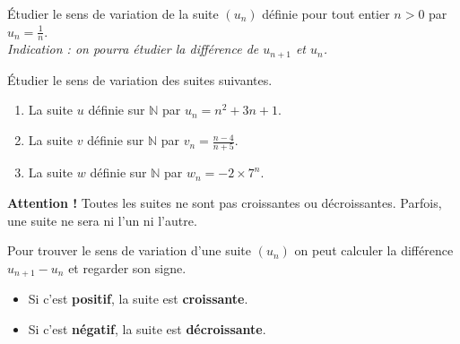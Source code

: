 \documentclass[11pt]{article}
\begin{document}
\begin{app}
  Étudier le sens de variation de la suite $(u_n)$ définie pour tout entier
  $n>0$ par $u_n=\frac{1}{n}$.\\
  \emph{Indication : on pourra étudier la différence de $u_{n+1}$ et $u_n$.}
\end{app}

\begin{app}
  Étudier le sens de variation des suites suivantes.
  \begin{enumerate}
    \item La suite $u$ définie sur $\mathbb{N}$ par $u_n=n^2+3n+1$.
    \item La suite $v$ définie sur $\mathbb{N}$ par $v_n=\frac{n-4}{n+5}$.
    \item La suite $w$ définie sur $\mathbb{N}$ par $w_n=-2\times7^n$.
  \end{enumerate}
\end{app}

\begin{rmq}
  \textbf{Attention !} Toutes les suites ne sont pas croissantes ou
  décroissantes. Parfois, une suite ne sera ni l'un ni l'autre.
\end{rmq}

\begin{methode}
  Pour trouver le sens de variation d'une suite $(u_n)$ on peut calculer la
  différence $u_{n+1}-u_n$ et regarder son signe.
  \begin{itemize}
    \item Si c'est \textbf{positif}, la suite est \textbf{croissante}.
    \item Si c'est \textbf{négatif}, la suite est \textbf{décroissante}.
  \end{itemize}
\end{methode}
\end{document}
